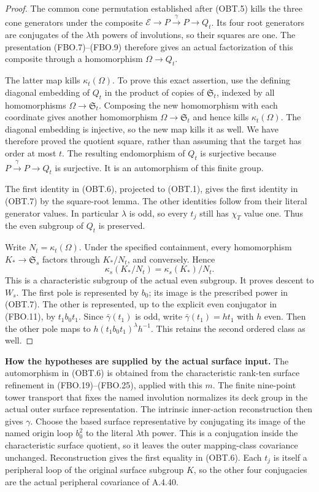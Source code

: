 \begin{proof}
The common cone permutation established after (OBT.5) kills
the three cone generators under the composite
$\mathcal E\to P\xrightarrow{\gamma}P\to Q_t$.
Its four root generators are conjugates of the $\lambda$th
powers of involutions, so their squares are one.  The
presentation (FBO.7)--(FBO.9) therefore gives an actual
factorization of this composite through a homomorphism
$\Omega\to Q_t$.

The latter map kills $\kappa_t(\Omega)$.
To prove this exact assertion, use the defining diagonal
embedding of $Q_t$ in the product of copies of
$\mathfrak S_t$, indexed by all homomorphisms
$\Omega\to\mathfrak S_t$.
Composing the new homomorphism with each coordinate gives
another homomorphism $\Omega\to\mathfrak S_t$ and hence
kills $\kappa_t(\Omega)$.  The diagonal embedding is
injective, so the new map kills it as well.
We have therefore proved the quotient square, rather than
assuming that the target has order at most $t$.
The resulting endomorphism of $Q_t$ is surjective because
$P\xrightarrow{\gamma}P\to Q_t$ is surjective.  It is
an automorphism of this finite group.

The first identity in (OBT.6), projected to (OBT.1), gives
the first identity in (OBT.7) by the square-root lemma.
The other identities follow from their literal generator
values.  In particular $\lambda$ is odd, so every $t_j$
still has $\chi_T$ value one.  Thus the even subgroup of
$Q_t$ is preserved.

Write $N_t=\kappa_t(\Omega)$.
Under the specified containment, every homomorphism
$K_*\to\mathfrak S_s$ factors through $K_*/N_t$,
and conversely.  Hence
\[
 \kappa_s(K_*/N_t)=\kappa_s(K_*)/N_t.
                                                               \tag{OBT.8}
\]
This is a characteristic subgroup of the actual even
subgroup.  It proves descent to $W_s$.
The first pole is represented by $b_0$; its image is the
prescribed power in (OBT.7).
The other is represented, up to the explicit even conjugator
in (FBO.11), by $t_1b_0t_1$.
Since $\bar\gamma(t_1)$ is odd, write
$\bar\gamma(t_1)=h t_1$ with $h$ even.
Then the other pole maps to
$h(t_1b_0t_1)^\lambda h^{-1}$.
This retains the second ordered class as well.
\end{proof}

\par\medskip\noindent\textbf{How the hypotheses are supplied by the actual surface input.}\quad
The automorphism in (OBT.6) is obtained from the characteristic
rank-ten surface refinement in (FBO.19)--(FBO.25), applied
with this $m$.  The finite nine-point tower transport that
fixes the named involution normalizes its deck group in
the actual outer surface representation.  The intrinsic
inner-action reconstruction then gives $\gamma$.
Choose the based surface representative by conjugating its
image of the named origin loop $b_0^2$ to the literal
$\lambda$th power.  This is a conjugation inside the
characteristic surface quotient, so it leaves the outer
mapping-class covariance unchanged.  Reconstruction gives
the first equality in (OBT.6).  Each $t_j$ is itself a
peripheral loop of the original surface subgroup $K$,
so the other four conjugacies are the actual peripheral
covariance of A.4.40.

